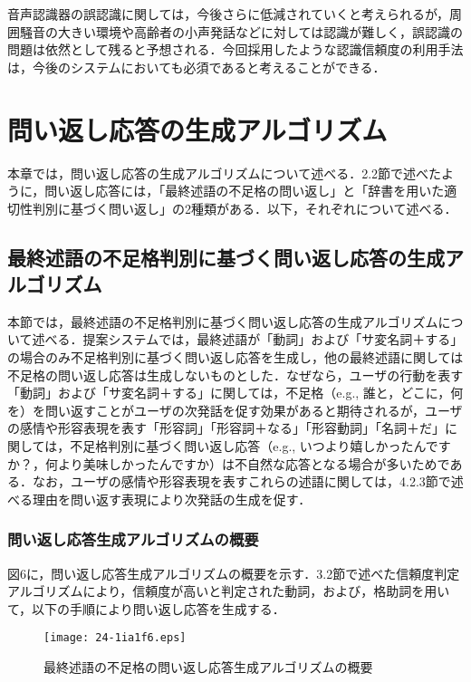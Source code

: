 \documentclass[japanese]{jnlp_1.4}
\begin{document}
音声認識器の誤認識に関しては，今後さらに低減されていくと考えられるが，周囲騒音の大きい環境や高齢者の小声発話などに対しては認識が難しく，誤認識の問題は依然として残ると予想される．今回採用したような認識信頼度の利用手法は，今後のシステムにおいても必須であると考えることができる．


\section{問い返し応答の生成アルゴリズム}

本章では，問い返し応答の生成アルゴリズムについて述べる．2.2節で述べたように，問い返し応答には，「最終述語の不足格の問い返し」と「辞書を用いた適切性判別に基づく問い返し」の2種類がある．以下，それぞれについて述べる．


\subsection{最終述語の不足格判別に基づく問い返し応答の生成アルゴリズム}

本節では，最終述語の不足格判別に基づく問い返し応答の生成アルゴリズムについて述べる．提案システムでは，最終述語が「動詞」および「サ変名詞＋する」の場合のみ不足格判別に基づく問い返し応答を生成し，他の最終述語に関しては不足格の問い返し応答は生成しないものとした．なぜなら，ユーザの行動を表す「動詞」および「サ変名詞＋する」に関しては，不足格（e.g., 誰と，どこに，何を）を問い返すことがユーザの次発話を促す効果があると期待されるが，ユーザの感情や形容表現を表す「形容詞」「形容詞＋なる」「形容動詞」「名詞＋だ」に関しては，不足格判別に基づく問い返し応答（e.g., いつより嬉しかったんですか？，何より美味しかったんですか）は不自然な応答となる場合が多いためである．なお，ユーザの感情や形容表現を表すこれらの述語に関しては，4.2.3節で述べる理由を問い返す表現により次発話の生成を促す．
 

\subsubsection{問い返し応答生成アルゴリズムの概要}

図6に，問い返し応答生成アルゴリズムの概要を示す．3.2節で述べた信頼度判定アルゴリズムにより，信頼度が高いと判定された動詞，および，格助詞を用いて，以下の手順により問い返し応答を生成する．
 
\begin{figure}[b]
\begin{center}
\texttt{[image: 24-1ia1f6.eps]}
\end{center}
\caption{最終述語の不足格の問い返し応答生成アルゴリズムの概要}
\label{fig:6}
\end{figure}
\end{document}
